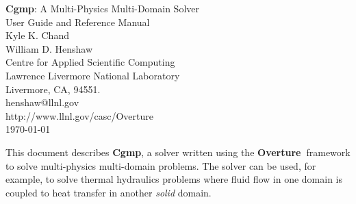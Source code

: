\documentclass[11pt]{article}
\newcommand{\Overture}{{\bf Over\-ture\ }}
\begin{document}


\def\comma  {~~~,~~}
\newcommand{\uvd}{\mathbf{U}}
\def\ud     {{    U}}
\def\pd     {{    P}}
\def\calo{{\cal O}}

\newcommand{\mbar}{\bar{m}}
\newcommand{\Rbar}{\bar{R}}
\newcommand{\Ru}{R_u}         %
\newcommand{\Div}{\grad\cdot}
\newcommand{\tauv}{\boldsymbol{\tau}}
\newcommand{\thetav}{\boldsymbol{\theta}}

\newcommand{\Omegav}{\boldsymbol{\Omega}}
\newcommand{\omegav}{\boldsymbol{\omega}}
\newcommand{\sigmav}{\boldsymbol{\sigma}}
\newcommand{\cm}{{\rm cm}}
\newcommand{\Jc}{{\mathcal J}}

\newcommand{\sumi}{\sum_{i=1}^n}
\newcommand{\dt}{{\Delta t}}

\def\ff {\tt} %



\newcommand{\bogus}[1]{}  %

\vspace{5\baselineskip}
\begin{flushleft}
{\Large
{\bf Cgmp}: A Multi-Physics Multi-Domain Solver \\
    User Guide and Reference Manual \\
}
\vspace{2\baselineskip}
Kyle K. Chand  \\
William D. Henshaw  \\
Centre for Applied Scientific Computing  \\
Lawrence Livermore National Laboratory      \\
Livermore, CA, 94551.  \\
henshaw@llnl.gov \\
http://www.llnl.gov/casc/Overture\\
\vspace{\baselineskip}
\today\\
\vspace{\baselineskip}

\vspace{4\baselineskip}


This document describes {\bf Cgmp}, a solver written using the \Overture framework
to solve multi-physics multi-domain problems. The solver can be used, for example,
to solve thermal hydraulics problems where fluid flow in one domain is coupled to heat transfer
in another {\em solid} domain.

\end{flushleft}
\end{document}
